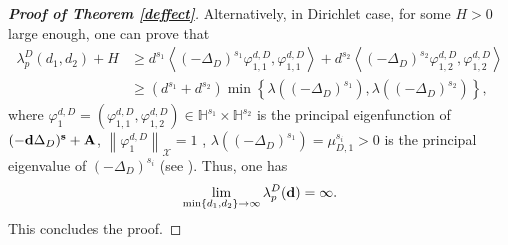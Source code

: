 \documentclass[a4paper,11pt]{amsart}
\newtheorem{remark}{Remark}
\theoremstyle{definition}
\def\O{\Omega}
\numberwithin{equation}{section}
\theoremstyle{definition}
\def\O{\Omega}
\begin{document}
\begin{proof} [\bf Proof of Theorem \ref{deffect}]

%


Alternatively, in Dirichlet case, for some $H>0$ large enough, one can prove that
\begin{align*}
\lambda_p^D(d_1,d_2) + 	H
&\geq d^{s_1}\left<(-\Delta_D)^{s_1}\varphi_{1,1}^{d,D},\varphi_{1,1}^{d,D}\right>+d^{s_2}\left<(-\Delta_D)^{s_2}\varphi_{1,2}^{d,D},\varphi_{1,2}^{d,D}\right>\\
&\geq \left(d^{s_1}+d^{s_2}\right)\min\left\{\lambda((-\Delta_D)^{s_1}),\lambda((-\Delta_D)^{s_2})\right\},
\end{align*}
where $\varphi_{1}^{d,D}=\left(\varphi_{1,1}^{d,D},\varphi_{1,2}^{d,D}\right)\in \mathbb{H}^{s_1}\times\mathbb{H}^{s_2}$ is the principal eigenfunction of $(-{\bf d}\Delta_D)^{\bf s}+{\bf A}$, $\left\|\varphi_{1}^{d,D}\right\|_{\mathcal{X}}=1$ , $\lambda((-\Delta_D)^{s_1})=\mu_{D,1}^{s_i}>0$ is the principal eigenvalue of $(-\Delta_D)^{s_i}$ (see \cite[Theorem 3.1]{zhao_spatiotemporal_2025}). Thus, one has
\begin{align*}
\lim\limits_{\min\{d_1,d_2\}\rightarrow \infty} \lambda_p^D({\bf d})=\infty.
\end{align*}
This concludes the proof.

\end{proof}
\end{document}

